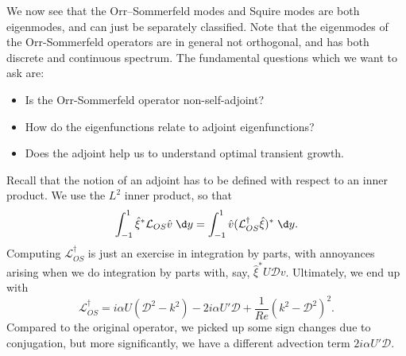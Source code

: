 \documentclass[a4paper]{article}
\begin{document}
We now see that the Orr--Sommerfeld modes and Squire modes are both eigenmodes, and can just be separately classified. Note that the eigenmodes of the Orr-Sommerfeld operators are in general not orthogonal, and has both discrete and continuous spectrum. The fundamental questions which we want to ask are:
\begin{itemize}
  \item Is the Orr-Sommerfeld operator non-self-adjoint?
  \item How do the eigenfunctions relate to adjoint eigenfunctions?
  \item Does the adjoint help us to understand optimal transient growth.
\end{itemize}
Recall that the notion of an adjoint has to be defined with respect to an inner product. We use the $L^2$ inner product, so that
\[
  \int_{-1}^1 \hat{\xi}^* \mathcal{L}_{OS} \hat{v} \;\d y = \int_{-1}^1 \hat{v} (\mathcal{L}_{OS}^\dagger \hat{\xi})^*\;\d y.
\]
Computing $\mathcal{L}_{OS}^\dagger$ is just an exercise in integration by parts, with annoyances arising when we do integration by parts with, say, $\hat{\xi}^* U \mathcal{D}v$. Ultimately, we end up with
\[
  \mathcal{L}_{OS}^\dagger = i\alpha U (\mathcal{D}^2 - k^2) - 2i \alpha U'\mathcal{D} + \frac{1}{Re} (k^2 - \mathcal{D}^2)^2.
\]
Compared to the original operator, we picked up some sign changes due to conjugation, but more significantly, we have a different advection term $2i\alpha U' \mathcal{D}$.
\end{document}
